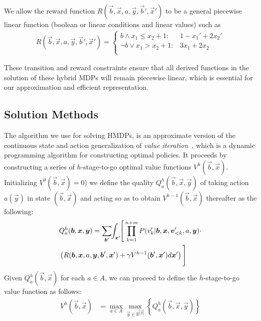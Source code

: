 
We allow the reward function $R(\vec{b},\vec{x},a,\vec{y},\vec{b}',\vec{x}')$ to be
a general piecewise linear function (boolean or linear conditions
and linear values) such as
\begin{align}
R(\vec{b},\vec{x},a,\vec{y},\vec{b}',\vec{x}') = \begin{cases}
b \land x_1 \leq x_2 + 1 : & 1 - x_1' + 2x_2' \\
\neg b \lor x_1 > x_2 + 1:     & 3x_1 + 2x_2 \\
\end{cases} \label{eq:linear_reward}
\end{align}

These transition and reward constraints ensure that all derived
functions in the solution of these hybrid MDPs will remain piecewise linear, which 
is essential for our approximation and efficient representation.

\subsection{Solution Methods}

\label{sec:soln}

The algorithm we use for solving HMDPs, is an approximate version of the continuous state and action generalization of {\it value iteration}~\cite{bellman}, which is a dynamic programming algorithm for constructing optimal policies.  It proceeds by constructing a series of $h$-stage-to-go optimal value functions $V^h(\vec{b},\vec{x})$.
Initializing $V^0(\vec{b},\vec{x}) = 0$) we define the quality
$Q_a^{h}(\vec{b},\vec{x},\vec{y})$ of taking action $a(\vec{y})$ in state
$(\vec{b},\vec{x})$ and acting so as to obtain $V^{h-1}(\vec{b},\vec{x})$ thereafter as the following:
\vspace{-2.5mm}
{\footnotesize
\begin{align}
& Q_a^{h}(\vec{b},\vec{x},\vec{y}) = \sum_{\vec{b}'} \hspace{-1.0mm} \int_{\vec{x}'} \hspace{-1.0mm} \Bigg[ 
\prod_{k=1}^{n+m} P(v_k'| \vec{b},\vec{x}, \vec{v}'_{<k}, a,\vec{y}) \cdot \label{eq:qfun} \\ 
& \left( R(\vec{b},\vec{x},a,\vec{y},\vec{b}',\vec{x}') + \gamma V^{h-1}(\vec{b}',\vec{x}') d\vec{x}' \right)  \Bigg] \nonumber
\end{align}}
Given $Q_a^h(\vec{b},\vec{x})$ for each $a \in A$, we can proceed
to define the $h$-stage-to-go value function as follows:
\begin{align}
V^{h}(\vec{b},\vec{x}) & = \max_{a \in A} \max_{\vec{y} \in \mathbb{R}^{|\vec{y}|}} \left\{ Q^{h}_a(\vec{b},\vec{x},\vec{y}) \right\} \label{eq:vfun}
\end{align}

